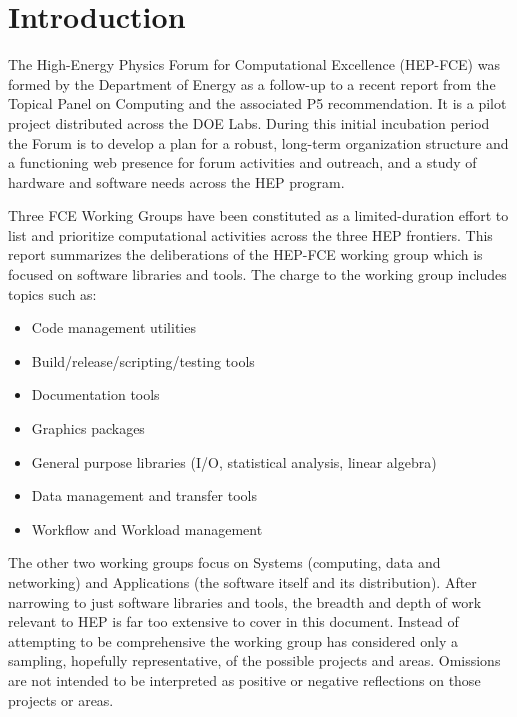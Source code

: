\section{Introduction}

The High-Energy Physics Forum for Computational Excellence (HEP-FCE)
was formed by the Department of Energy as a follow-up to a recent
report from the Topical Panel on Computing\cite{topicalpanel} and the
associated P5 recommendation\cite{p5}.
%
It is a  pilot project distributed across the DOE Labs.  
%
During this initial incubation period the Forum is to develop a plan
for a robust, long-term organization structure and a functioning web
presence for forum activities and outreach, and a study of hardware
and software needs across the HEP program.

Three FCE Working Groups have been constituted as a limited-duration effort 
to list and prioritize computational activities across the three HEP frontiers.
This report summarizes the deliberations of the HEP-FCE working group which 
is focused on software libraries and tools. The charge to the working group 
includes topics such as:

\begin{itemize}
\item Code management utilities
\item Build/release/scripting/testing tools
\item Documentation tools
\item Graphics packages
\item General purpose libraries (I/O, statistical analysis, linear algebra)
\item  Data management and transfer tools
\item  Workflow and Workload management
\end{itemize}

The other two working groups focus on Systems (computing, data and networking)
and Applications (the software itself and its distribution).   
%
After narrowing to just software libraries and tools, the breadth and
depth of work relevant to HEP is far too extensive to cover in this
document.  Instead of attempting to be comprehensive the working group
has considered only a sampling, hopefully representative, of the
possible projects and areas.  Omissions are not intended to be
interpreted as positive or negative reflections on those projects or
areas.

